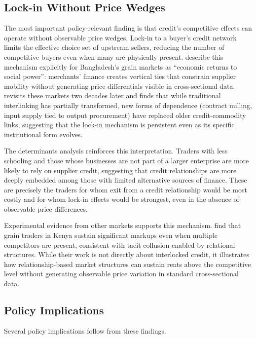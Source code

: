 \documentclass[authoryear,preprint,review,12pt]{elsarticle}
\begin{document}
\subsection{Lock-in Without Price Wedges}

The most important policy-relevant finding is that credit's competitive effects
can operate without observable price wedges. Lock-in to a buyer's credit
network limits the effective choice set of upstream sellers, reducing
the number of competitive buyers even when many are physically present.
\citet{crow_murshid1994} describe this mechanism explicitly for Bangladesh's
grain markets as ``economic returns to social power'': merchants' finance
creates vertical ties that constrain supplier mobility without generating
price differentials visible in cross-sectional data.
\citet{murshid2015} revisits these markets two decades later and finds
that while traditional interlinking has partially transformed, new forms
of dependence (contract milling, input supply tied to output procurement)
have replaced older credit-commodity links, suggesting that the lock-in
mechanism is persistent even as its specific institutional form evolves.

The determinants analysis reinforces this interpretation. Traders with
less schooling and those whose businesses are not part of a larger
enterprise are more likely to rely on supplier credit, suggesting that
credit relationships are more deeply embedded among those with limited
alternative sources of finance. These are precisely the traders for whom
exit from a credit relationship would be most costly and for whom lock-in
effects would be strongest, even in the absence of observable price
differences.

Experimental evidence from other markets supports this mechanism.
\citet{bergquist_dinerstein2020} find that grain traders in Kenya sustain
significant markups even when multiple competitors are present, consistent
with tacit collusion enabled by relational structures. While their work
is not directly about interlocked credit, it illustrates how relationship-based
market structures can sustain rents above the competitive level without
generating observable price variation in standard cross-sectional data.

\subsection{Policy Implications}

Several policy implications follow from these findings.
\end{document}

